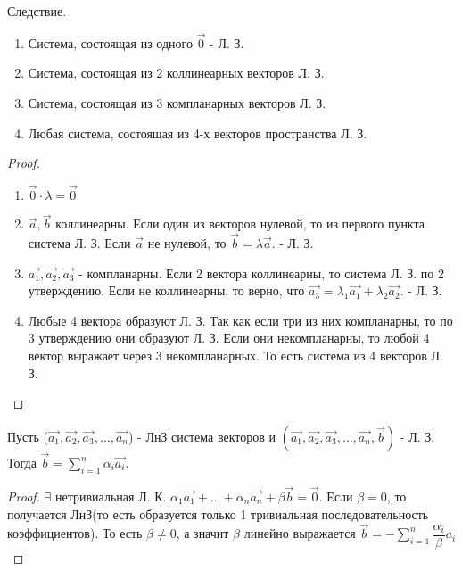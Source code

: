 \begin{proposition}
	Следствие. 
	\begin{enumerate}
		\item Система, состоящая из одного $\vec{0}$ - Л. З. 
		\item Система, состоящая из 2 коллинеарных векторов Л. З.
		\item Система, состоящая из 3 компланарных векторов Л. З.
		\item Любая система, состоящая из 4-х векторов пространства Л. З.
	\end{enumerate}
\end{proposition}
\begin{proof}
	\begin{enumerate}
		\item $\vec{0}\cdot\lambda = \vec{0}$
		\item $\vec{a}, \vec{b}$ коллинеарны. Если один из векторов нулевой, то из первого пункта система Л. З. Если $\vec{a}$ не нулевой, то $\vec{b} = \lambda\vec{a}$. - Л. З.
		\item $\vec{a_1}, \vec{a_2}, \vec{a_3}$ - компланарны. Если 2 вектора коллинеарны, то система Л. З. по 2 утверждению. Если не коллинеарны, то верно, что $\vec{a_3} = \lambda_1\vec{a_1} + \lambda_2\vec{a_2}$. - Л. З.
		\item Любые 4 вектора образуют Л. З. Так как если три из них компланарны, то по 3 утверждению они образуют Л. З. Если они некомпланарны, то любой 4 вектор выражает через 3 некомпланарных. То есть система из 4 векторов Л. З.
	\end{enumerate}
\end{proof}
\begin{proposition}
	Пусть ($\vec{a_1}, \vec{a_2}, \vec{a_3}, \ldots, \vec{a_n}$) - ЛнЗ система векторов и $(\vec{a_1}, \vec{a_2}, \vec{a_3}, \ldots, \vec{a_n}, \vec{b})$ - Л. З. Тогда $\vec{b} = \sum_{i=1}^{n}\alpha_i\vec{a_i}$.
\end{proposition}
\begin{proof}
	$\exists$ нетривиальная Л. К. \(\alpha_1\vec{a_1}+\ldots+\alpha_n\vec{a_n}+\beta\vec{b} = \vec{0}\). Если $\beta = 0$, то получается ЛнЗ(то есть образуется только 1 тривиальная последовательность коэффициентов). То есть $\beta\ne0$, а значит $\beta$ линейно выражается $\vec{b} = -\sum_{i=1}^{n}\dfrac{\alpha_i}{\beta}a_i$
\end{proof}

